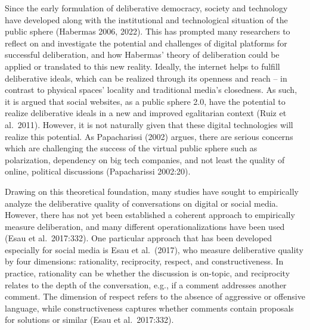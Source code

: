 \documentclass[
]{article}
\begin{document}
Since the early formulation of deliberative democracy, society and
technology have developed along with the institutional and technological
situation of the public sphere (Habermas 2006, 2022). This has prompted
many researchers to reflect on and investigate the potential and
challenges of digital platforms for successful deliberation, and how
Habermas' theory of deliberation could be applied or translated to this
new reality. Ideally, the internet helps to fulfill deliberative ideals,
which can be realized through its openness and reach -- in contrast to
physical spaces' locality and traditional media's closedness. As such,
it is argued that social websites, as a public sphere 2.0, have the
potential to realize deliberative ideals in a new and improved
egalitarian context (Ruiz et al.~2011). However, it is not naturally
given that these digital technologies will realize this potential. As
Papacharissi (2002) argues, there are serious concerns which are
challenging the success of the virtual public sphere such as
polarization, dependency on big tech companies, and not least the
quality of online, political discussions (Papacharissi 2002:20).

Drawing on this theoretical foundation, many studies have sought to
empirically analyze the deliberative quality of conversations on digital
or social media. However, there has not yet been established a coherent
approach to empirically measure deliberation, and many different
operationalizations have been used (Esau et al.~2017:332). One
particular approach that has been developed especially for social media
is Esau et al.~(2017), who measure deliberative quality by four
dimensions: rationality, reciprocity, respect, and constructiveness. In
practice, rationality can be whether the discussion is on-topic, and
reciprocity relates to the depth of the conversation, e.g., if a comment
addresses another comment. The dimension of respect refers to the
absence of aggressive or offensive language, while constructiveness
captures whether comments contain proposals for solutions or similar
(Esau et al.~2017:332).
\end{document}
